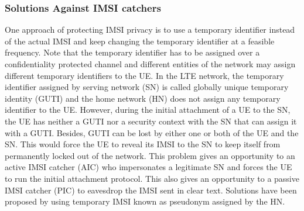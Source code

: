 \documentclass[conference]{IEEEtran}
\begin{document}
\subsubsection{Solutions Against IMSI catchers}
One approach of protecting IMSI privacy is to use a temporary identifier instead of the actual IMSI and keep changing the temporary identifier at a feasible frequency. Note that the temporary identifier has to be assigned over a confidentiality protected channel and different entities of the network may assign different temporary identifiers to the UE. In the LTE network, the temporary identifier assigned by serving network (SN) is called globally unique temporary identity (GUTI) and the home network (HN) does not assign any temporary identifier to the UE. However, during the initial attachment of a UE to the SN, the UE has neither a GUTI nor a security context with the SN that can assign it with a GUTI. Besides, GUTI can be lost by either one or both of the UE and the SN. This would force the UE to reveal its IMSI to the SN to keep itself from permanently locked out of the network. This problem gives an opportunity to an active IMSI catcher (AIC) who impersonates a legitimate SN and forces the UE to run the initial attachment protocol. This also gives an opportunity to a passive IMSI catcher (PIC) to eavesdrop the IMSI sent in clear text. Solutions \cite{pseudonym_valtteri_philip, pseudonym_ericsson} have been proposed by using temporary IMSI known as pseudonym assigned by the HN. 
\end{document}
